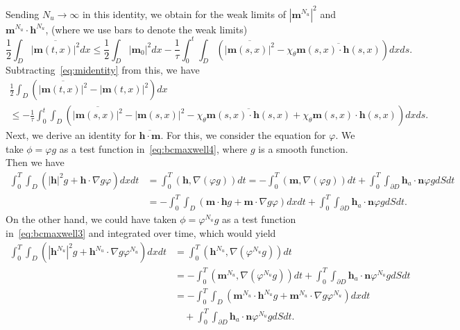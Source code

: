 \documentclass[10pt,letterpaper,twoside]{amsart}
\theoremstyle{definition}{\newtheorem{definition}[lemma]{Definition}}
\theoremstyle{note}{\newtheorem{claim}{Claim}[section]
\newtheorem*{claim*}{Claim}}
\numberwithin{equation}{section}
\newcommand{\dom}{D}
\newcommand{\Grad}{\nabla}
\newcommand{\bm}{\mathbf{m}}
\newcommand{\bh}{\mathbf{h}}
\begin{document}
 Sending $N_u\to \infty$ in this identity, we obtain for the weak limits of $|\bm^{N_u}|^2$ and $\bm^{N_u}\cdot \bh^{N_u}$, (where we use bars to denote the weak limits)
  \begin{equation}\label{eq:midentity1}
 		\frac12\int_{\dom} \overline{|\bm(t,x)|^2} dx\leq \frac12\int_{\dom} |\bm_0|^2 dx-\frac{1}{\tau}\int_0^t\int_{\dom}(\overline{|\bm(s,x)|^2}-\chi_{\theta}\overline{\bm(s,x)\cdot  \bh(s,x)}) dx ds.
 \end{equation}
 Subtracting~\eqref{eq:midentity} from this, we have
   \begin{multline}\label{eq:midentity2}
 		\frac12\int_{\dom}\left( \overline{|\bm(t,x)|^2} - |\bm(t,x)|^2\right) dx\\
 		\leq -\frac{1}{\tau}\int_0^t\int_{\dom}(\overline{|\bm(s,x)|^2}-|\bm(s,x)|^2-\chi_{\theta}\overline{\bm(s,x)\cdot  \bh(s,x)}+\chi_{\theta}\bm(s,x)\cdot  \bh(s,x)) dx ds.
 \end{multline}
 Next, we derive an identity for $\overline{\bh\cdot\bm}$. For this, we consider the equation for $\varphi$. We take  $\phi=\varphi g$ as a test function in~\eqref{eq:bcmaxwell4}, where $g$ is a smooth function. Then we have
 \begin{equation}
 	\label{eq:hidentity}
 	\begin{split}
 		\int_0^T \int_{\dom} \left(|\bh|^2 g + \bh\cdot\Grad g \varphi \right) dxdt&  =	\int_0^T(\bh,\Grad(\varphi g))dt  = -\int_0^T(\bm,\Grad(\varphi g))dt + \int_0^T\int_{\partial\dom} \bh_a\cdot \mathbf{n}\varphi g dSdt \\
 		& =  -\int_0^T\int_{\dom}\left(\bm\cdot\bh g + \bm\cdot\Grad g \varphi\right)dxdt + \int_0^T\int_{\partial\dom} \bh_a\cdot \mathbf{n}\varphi g dSdt.
 	\end{split}
 \end{equation}
 On the other hand, we could have taken $\phi = \varphi^{N_u}g$ as a  test function in~\eqref{eq:bcmaxwell3} and integrated over time, which would yield
  \begin{equation}
 	\label{eq:hidentity2}
 	\begin{split}
 		\int_0^T \int_{\dom} \left(|\bh^{N_u}|^2 g + \bh^{N_u}\cdot\Grad g \varphi^{N_u} \right) dxdt&  =	\int_0^T (\bh^{N_u},\Grad(\varphi^{N_u} g))  dt\\
 		& = -\int_0^T(\bm^{N_u},\Grad(\varphi^{N_u} g))dt + \int_0^T\int_{\partial\dom} \bh_a\cdot \mathbf{n}\varphi^{N_u} g dSdt \\
 		& =  -\int_0^T\int_{\dom} \left(\bm^{N_u}\cdot\bh^{N_u} g + \bm^{N_u}\cdot\Grad g \varphi^{N_u}\right)dx dt \\
 		&\quad + \int_0^T\int_{\partial\dom} \bh_a\cdot \mathbf{n}\varphi^{N_u} g dSdt.
 	\end{split}
 \end{equation}
\end{document}
